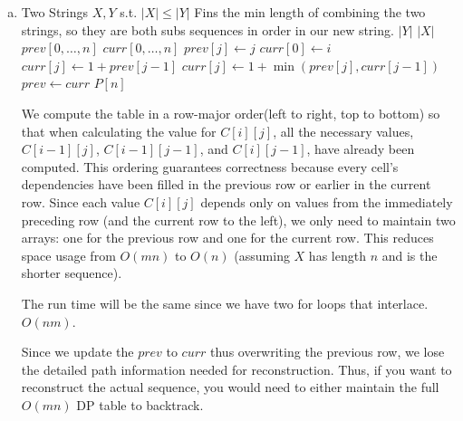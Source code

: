 \documentclass[12pt, letterpaper]{article}
\theoremstyle{definition}
\begin{document}
\begin{enumerate}[(a)]
    \item \begin{algorithm}[H]
        \caption{Min Cost}
        \begin{algorithmic}[1]
        \Require Two Strings $X,Y$ s.t. $|X| \leq |Y|$
        \Ensure Fins the min length of combining the two strings, so they are both subs sequences in order in our new string.
                \State \Return $|Y|$
            \EndIf
                \State \Return $|X|$
            \EndIf
            \State $prev[0,\dots,n]$
            \State $curr[0,\dots,n]$
                \State $prev[j] \gets j$
            \EndFor
                \State $curr[0] \gets i$
                        \State $curr[j] \gets 1 + prev[j-1]$
                    \Else
                        \State $curr[j] \gets 1 + \min(prev[j], curr[j-1])$
                    \EndIf
                \EndFor
                \State $prev \gets curr$
            \EndFor
            \State \Return $P[n]$
        \EndFunction
        \end{algorithmic}
        \end{algorithm}
        We compute the table in a row-major order(left to right, top to bottom) so that when calculating the value for \(C[i][j]\), all the necessary values, \(C[i-1][j]\), \(C[i-1][j-1]\), and \(C[i][j-1]\), have already been computed. This ordering guarantees correctness because every cell’s dependencies have been filled in the previous row or earlier in the current row. Since each value \(C[i][j]\) depends only on values from the immediately preceding row (and the current row to the left), we only need to maintain two arrays: one for the previous row and one for the current row. This reduces space usage from \(O(mn)\) to \(O(n)\) (assuming \(X\) has length \(n\) and is the shorter sequence).

        The run time will be the same since we have two for loops that interlace. $O(nm)$.

        Since we update the $prev$ to $curr$ thus overwriting the previous row, we lose the detailed path information needed for reconstruction. Thus, if you want to reconstruct the actual sequence, you would need to either maintain the full \(O(mn)\) DP table to backtrack.
\end{enumerate}
\end{document}
